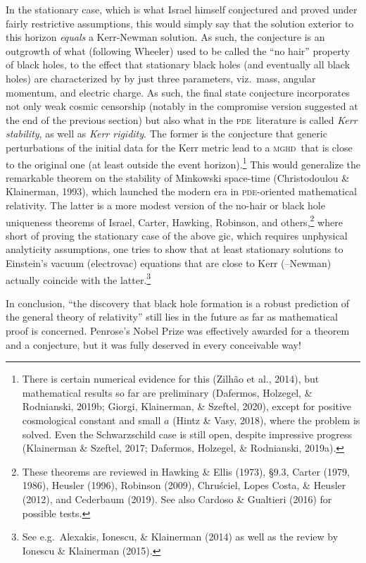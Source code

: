\documentclass[12pt]{article}
\newcommand{\mghd}{\textsc{mghd}}
\newcommand{\pde}{\textsc{pde}}
\begin{document}
 In the stationary case, which is what Israel himself conjectured and proved under fairly restrictive assumptions, this would simply say that the solution exterior to this horizon \emph{equals} a Kerr-Newman solution. As such, the conjecture  is an outgrowth of what (following Wheeler) used to be called the ``no hair'' property of black holes, to the effect that stationary black holes (and eventually all black holes)
  are characterized by by just three parameters, viz.\ mass, angular momentum, and electric charge. As such, the final state conjecture incorporates not only weak cosmic censorship (notably in the compromise version suggested at the end of the previous section) but also what in the \pde\ literature is called \emph{Kerr stability},  as well as \emph{Kerr rigidity}. The former is
   the conjecture that generic  perturbations of the  initial data
 for the  Kerr metric lead to a \mghd\ that is close to the original one (at least outside the event horizon).\footnote{There is certain  numerical evidence for this (Zilh\~{a}o et al., 2014), but mathematical results so far are  preliminary (Dafermos,  Holzegel, \&  Rodnianski, 2019b; 
Giorgi, Klainerman, \& Szeftel, 2020), except for positive cosmological constant and small $a$  (Hintz \& Vasy, 2018), where the problem is solved. 
Even the Schwarzschild case is still open, despite impressive progress (Klainerman \& Szeftel, 2017; Dafermos,  Holzegel, \&  Rodnianski, 2019a).
} This would generalize the remarkable theorem on the stability of Minkowski space-time (Christodoulou \& Klainerman, 1993), which launched the modern era in \pde-oriented mathematical relativity. 
The latter  is a more modest version of the no-hair or black hole uniqueness theorems of Israel, Carter, Hawking, Robinson, and others,\footnote{These theorems are reviewed in Hawking \& Ellis (1973), \S 9.3, Carter (1979, 1986), Heusler (1996), Robinson (2009), Chru\'{s}ciel,  Lopes Costa, \& Heusler (2012), and Cederbaum (2019).  See also Cardoso \&  Gualtieri (2016) for possible  tests.
} where short of proving the stationary case of the above {\sc gic}, which requires unphysical analyticity assumptions, one tries to show that at least stationary solutions to Einstein's vacuum (electrovac) equations that are close to Kerr (--Newman) actually coincide with the latter.\footnote{See e.g.\
Alexakis,  Ionescu, \& Klainerman (2014) as well as the review by Ionescu \&  Klainerman (2015).}
\smallskip

In conclusion, ``the discovery that black hole formation is a robust prediction of the general theory of relativity'' still lies in the future as far as mathematical proof is concerned. Penrose's Nobel Prize was effectively awarded for a theorem and a conjecture, but it was fully deserved in every conceivable way!
\appendix
\end{document}
